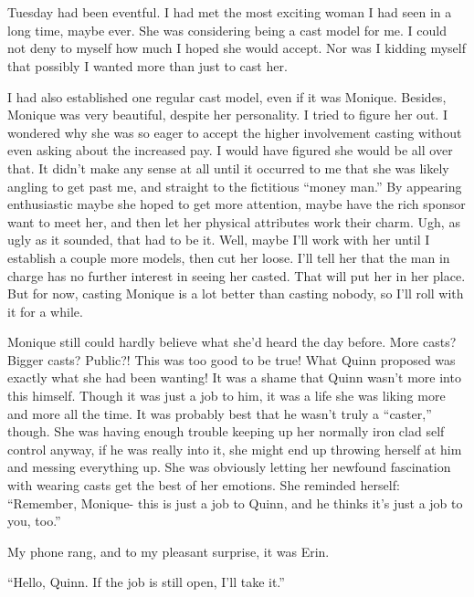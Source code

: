 \chapter{}
Tuesday had been eventful. I had met the most exciting woman I had seen in a long time,
maybe ever. She was considering being a cast model for me. I could not deny to myself how much I
hoped she would accept. Nor was I kidding myself that possibly I wanted more than just to cast
her.

I had also established one regular cast model, even if it was Monique. Besides, Monique was
very beautiful, despite her personality. I tried to figure her out. I wondered why she was so
eager to accept the higher involvement casting without even asking about the increased pay. I
would have figured she would be all over that. It didn't make any sense at all until it occurred
to me that she was likely angling to get past me, and straight to the fictitious ``money man.''
By appearing enthusiastic maybe she hoped to get more attention, maybe have the rich sponsor
want to meet her, and then let her physical attributes work their charm. Ugh, as ugly as it
sounded, that had to be it. Well, maybe I'll work with her until I establish a couple more
models, then cut her loose. I'll tell her that the man in charge has no further interest in
seeing her casted. That will put her in her place. But for now, casting Monique is a lot better
than casting nobody, so I'll roll with it for a while.

\begin{thought}
Monique still could hardly believe what she'd heard the day before. More casts? Bigger
casts? Public?! This was too good to be true! What Quinn proposed was exactly what she had been
wanting! It was a shame that Quinn wasn't more into this himself. Though it was just a job to
him, it was a life she was liking more and more all the time. It was probably best that he
wasn't truly a ``caster,'' though. She was having enough trouble keeping up her normally iron
clad self control anyway, if he was really into it, she might end up throwing herself at him and
messing everything up. She was obviously letting her newfound fascination with wearing casts get
the best of her emotions. She reminded herself: ``Remember, Monique- this is just a job to
Quinn, and he thinks it's just a job to you, too.''
\end{thought}

My phone rang, and to my pleasant surprise, it was Erin.

``Hello, Quinn. If the job is still open, I'll take it.''

